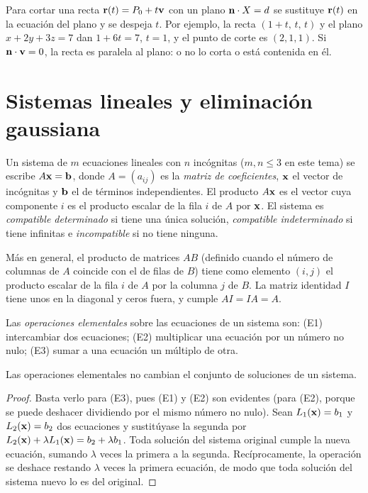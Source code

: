 Para cortar una recta $\mathbf{r}(t)=P_0+t\mathbf{v}$ con un plano $\mathbf{n}\cdot X=d$ se sustituye $\mathbf{r}(t)$ en la ecuación del plano y se despeja $t$. Por ejemplo, la recta $(1+t,\,t,\,t)$ y el plano $x+2y+3z=7$ dan $1+6t=7$, $t=1$, y el punto de corte es $(2,1,1)$. Si $\mathbf{n}\cdot\mathbf{v}=0$, la recta es paralela al plano: o no lo corta o está contenida en él.

\section{Sistemas lineales y eliminación gaussiana}\label{sec:t2-gauss}

\begin{definicion}\label{def:sistema}
Un sistema de $m$ ecuaciones lineales con $n$ incógnitas ($m,n\le3$ en este tema) se escribe $A\mathbf{x}=\mathbf{b}$, donde $A=(a_{ij})$ es la \emph{matriz de coeficientes}, $\mathbf{x}$ el vector de incógnitas y $\mathbf{b}$ el de términos independientes. El producto $A\mathbf{x}$ es el vector cuya componente $i$ es el producto escalar de la fila $i$ de $A$ por $\mathbf{x}$. El sistema es \emph{compatible determinado} si tiene una única solución, \emph{compatible indeterminado} si tiene infinitas e \emph{incompatible} si no tiene ninguna.
\end{definicion}

Más en general, el producto de matrices $AB$ (definido cuando el número de columnas de $A$ coincide con el de filas de $B$) tiene como elemento $(i,j)$ el producto escalar de la fila $i$ de $A$ por la columna $j$ de $B$. La matriz identidad $I$ tiene unos en la diagonal y ceros fuera, y cumple $AI=IA=A$.

\begin{definicion}\label{def:elementales}
Las \emph{operaciones elementales} sobre las ecuaciones de un sistema son: (E1) intercambiar dos ecuaciones; (E2) multiplicar una ecuación por un número no nulo; (E3) sumar a una ecuación un múltiplo de otra.
\end{definicion}

\begin{proposicion}\label{prop:elementales}
Las operaciones elementales no cambian el conjunto de soluciones de un sistema.
\end{proposicion}

\begin{proof}
Basta verlo para (E3), pues (E1) y (E2) son evidentes (para (E2), porque se puede deshacer dividiendo por el mismo número no nulo). Sean $L_1(\mathbf{x})=b_1$ y $L_2(\mathbf{x})=b_2$ dos ecuaciones y sustitúyase la segunda por $L_2(\mathbf{x})+\lambda L_1(\mathbf{x})=b_2+\lambda b_1$. Toda solución del sistema original cumple la nueva ecuación, sumando $\lambda$ veces la primera a la segunda. Recíprocamente, la operación se deshace restando $\lambda$ veces la primera ecuación, de modo que toda solución del sistema nuevo lo es del original.
\end{proof}

